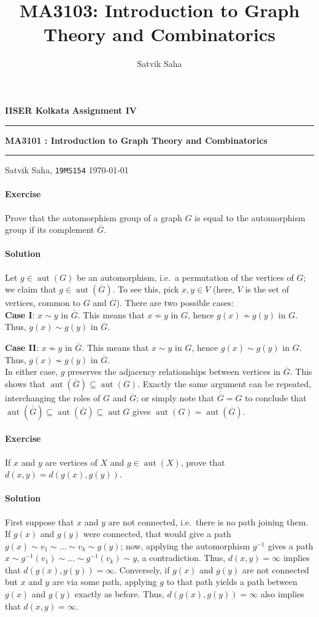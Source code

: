 \documentclass[10pt]{article}
\title{MA3103: Introduction to Graph Theory and Combinatorics}
\author{Satvik Saha}
\date{}
\newcounter{prob}
\newcommand{\problem}{\stepcounter{prob}\paragraph{Exercise \arabic{prob}}}
\newcommand{\solution}{\paragraph{Solution}}
\DeclareMathOperator{\aut}{aut}
\begin{document}
    \noindent\textbf{IISER Kolkata} \hfill \textbf{Assignment IV}
    \vspace{3pt}
    \hrule
    \vspace{3pt}
    \begin{center}
    \LARGE{\textbf{MA3101 : Introduction to Graph Theory and Combinatorics}}
    \end{center}
    \vspace{3pt}
    \hrule
    \vspace{3pt}
    Satvik Saha, \texttt{19MS154} \hfill \today
    \vspace{20pt}

    \problem Prove that the automorphism group of a graph $G$ is equal to the
    automorphism group if its complement $\overline{G}$.

    \solution Let $g \in \aut(G)$ be an automorphism, i.e.\ a permutation of the
    vertices of $G$; we claim that $g \in \aut(\overline{G})$. To see this, pick $x,
    y \in V$ (here, $V$ is the set of vertices, common to $G$ and $\overline{G}$).
    There are two possible cases: \\
    
    \textbf{Case I}: $x \sim y$ in $\overline{G}$. This means that $x \not\sim y$ in
    $G$, hence $g(x) \not\sim g(y)$ in $G$. Thus, $g(x) \sim g(y)$ in $\overline{G}$.

    \textbf{Case II}: $x \not\sim y$ in $\overline{G}$. This means that $x \sim y$ in
    $G$, hence $g(x) \sim g(y)$ in $G$. Thus, $g(x) \not\sim g(y)$ in $\overline{G}$.
    \\

    In either case, $g$ preserves the adjacency relationships between vertices in
    $\overline{G}$. This shows that $\aut(\overline{G}) \subseteq \aut(G)$. Exactly
    the same argument can be repeated, interchanging the roles of $G$ and
    $\overline{G}$; or simply note that $\overline{\overline{G}} = G$ to conclude
    that $\aut(\overline{\overline{G}}) \subseteq \aut(\overline{G}) \subseteq
    \aut{G}$ gives $\aut(G) = \aut(\overline{G})$.


    \problem If $x$ and $y$ are vertices of $X$ and $g \in \aut(X)$, prove that $d(x,
    y) = d(g(x), g(y))$.

    \solution First suppose that $x$ and $y$ are not connected, i.e.\ there is no
    path joining them. If $g(x)$ and $g(y)$ were connected, that would give a path
    $g(x) \sim v_1 \sim \dots \sim v_k \sim g(y)$; now, applying the automorphism
    $g^{-1}$ gives a path $x \sim g^{-1}(v_1) \sim \dots \sim g^{-1}(v_k) \sim y$, a
    contradiction. Thus, $d(x, y) = \infty$ implies that $d(g(x), g(y)) = \infty$.
    Conversely, if $g(x)$ and $g(y)$ are not connected but $x$ and $y$ are via some
    path, applying $g$ to that path yields a path between $g(x)$ and $g(y)$ exactly
    as before. Thus, $d(g(x), g(y)) = \infty$ also implies that $d(x, y) = \infty$.
\end{document}
